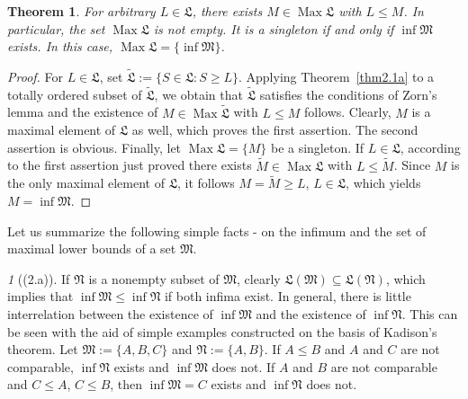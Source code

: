 \documentclass[12pt, a4paper, reqno, twoside]{amsart}
\numberwithin{equation}{section}
\DeclareMathOperator{\Max}{Max}
\newcommand{\frakL}{\mathfrak L}
\newcommand{\frakM}{\mathfrak M}
\newcommand{\frakN}{\mathfrak N}
\newtheorem{theorem}{Theorem}[section]
\theoremstyle{definition}
\theoremstyle{remark}
\theoremstyle{mystyle}
\newtheorem*{fact*}{}
\begin{document}
\begin{theorem}
\label{thm2.1}
For arbitrary $L\in\frakL$, there exists $M\in\Max\frakL$ with $L\leq
M$. In particular, the set $\Max\frakL$ is not empty. It is a
singleton  if and only if\/ $\inf\frakM$ exists. In this case, $\Max\frakL=\{\inf\frakM\}$.
\end{theorem}

\begin{proof}
For $L\in\frakL$, set $\widetilde{\frakL}:=\{S\in\frakL : S\geq L\}$.
Applying Theorem~\ref{thm2.1a} to a totally ordered subset of
$\widetilde{\frakL}$, we obtain that $\widetilde{\frakL}$ satisfies
the conditions of Zorn's lemma and the existence of
$M\in\Max\widetilde{\frakL}$ with $L\leq M$ follows. Clearly, $M$ is a
maximal element of $\frakL$ as well, which proves the first assertion.
The second assertion is obvious. Finally, let $\Max\frakL=\{M\}$ be a
singleton. If $L\in\frakL$, according to the first assertion just
proved  there exists $\widetilde{M}\in\Max\frakL$ with
$L\leq\widetilde{M}$.  Since $M$ is the only maximal element of
$\frakL$, it follows $M=\widetilde{M}\geq L$, $L\in\frakL$, which
yields $M=\inf\frakM$. 
\end{proof}

Let us summarize the following simple facts
-  on the infimum and the set of maximal
lower bounds of a set $\frakM$.

  

\begin{fact*}[(2.a)]
\label{fa2.a} 
If $\frakN$ is a nonempty subset of $\frakM$, clearly
$\frakL(\frakM)\subseteq\frakL(\frakN)$, which implies that
$\inf\frakM\leq\inf\frakN$ if both infima exist. In general, there
is little interrelation between the existence of $\inf\frakM$ and the
existence of $\inf\frakN$. This can be seen with the aid of simple
examples constructed on the basis of Kadison's theorem. Let
$\frakM:=\{A,B,C\}$ and $\frakN:=\{A,B\}$. If $A\leq B$ and $A$ and $C$
are not comparable, $\inf\frakN$ exists and $\inf\frakM$ does not. If
$A$ and $B$ are not comparable and $C\leq A$, $C\leq B$, then
$\inf\frakM=C$ exists and $\inf\frakN$ does not.
\end{fact*}
\end{document}
